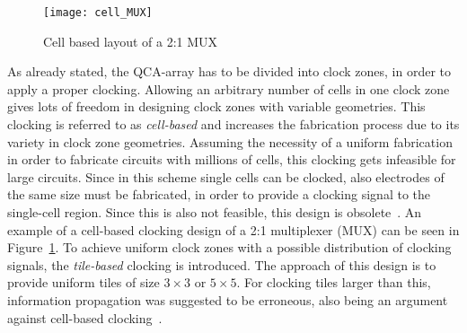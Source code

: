 \begin{figure}
	\centering
	\texttt{[image: cell\_MUX]}
	\caption{Cell based layout of a 2:1 MUX~\cite{majeed2019optimal}}\label{fig:cell_based_mux}
\end{figure}

As already stated, the QCA-array has to be divided into clock zones, in order to apply a proper clocking. Allowing an arbitrary number of cells in one clock zone gives lots of freedom in designing clock zones with variable geometries. This clocking is referred to as \textit{cell-based} and increases the fabrication process due to its variety in clock zone geometries. Assuming the necessity of a uniform fabrication in order to fabricate circuits with millions of cells, this clocking gets infeasible for large circuits. Since in this scheme single cells can be clocked, also electrodes of the same size must be fabricated, in order to provide a clocking signal to the single-cell region. Since this is also not feasible, this design is obsolete~\cite{blair2003architecture}. An example of a cell-based clocking design of a 2:1 multiplexer (MUX) can be seen in Figure~\ref{fig:cell_based_mux}. To achieve uniform clock zones with a possible distribution of clocking signals, the \textit{tile-based} clocking is introduced. The approach of this design is to provide uniform tiles of size $3 \times 3$ or $5 \times 5$. For clocking tiles larger than this, information propagation was suggested to be erroneous, also being an argument against cell-based clocking~\cite{taucer2015consequences}.


